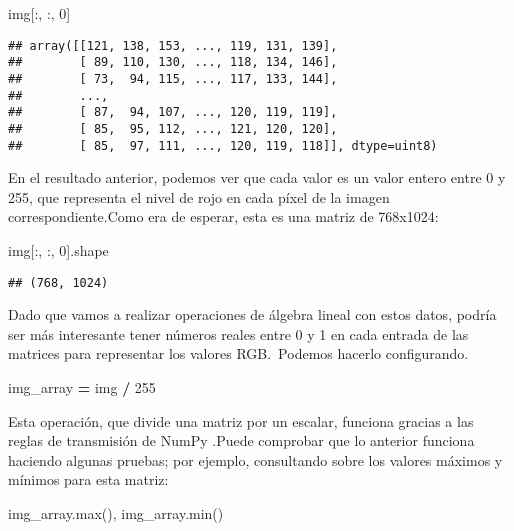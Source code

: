 \documentclass[
]{article}
\newenvironment{Shaded}{\begin{snugshade}}{\end{snugshade}}
\newcommand{\BuiltInTok}[1]{#1}
\newcommand{\DecValTok}[1]{\textcolor[rgb]{0.00,0.00,0.81}{#1}}
\newcommand{\NormalTok}[1]{#1}
\newcommand{\OperatorTok}[1]{\textcolor[rgb]{0.81,0.36,0.00}{\textbf{#1}}}
\begin{document}
\begin{Shaded}
\begin{Highlighting}[]
\NormalTok{img[:, :, }\DecValTok{0}\NormalTok{]}
\end{Highlighting}
\end{Shaded}

\begin{verbatim}
## array([[121, 138, 153, ..., 119, 131, 139],
##        [ 89, 110, 130, ..., 118, 134, 146],
##        [ 73,  94, 115, ..., 117, 133, 144],
##        ...,
##        [ 87,  94, 107, ..., 120, 119, 119],
##        [ 85,  95, 112, ..., 121, 120, 120],
##        [ 85,  97, 111, ..., 120, 119, 118]], dtype=uint8)
\end{verbatim}

En el resultado anterior, podemos ver que cada valor es un valor entero
entre 0 y 255, que representa el nivel de rojo en cada píxel de la
imagen correspondiente.Como era de esperar, esta es una matriz de
768x1024:

\begin{Shaded}
\begin{Highlighting}[]
\NormalTok{img[:, :, }\DecValTok{0}\NormalTok{].shape}
\end{Highlighting}
\end{Shaded}

\begin{verbatim}
## (768, 1024)
\end{verbatim}

Dado que vamos a realizar operaciones de álgebra lineal con estos datos,
podría ser más interesante tener números reales entre 0 y 1 en cada
entrada de las matrices para representar los valores RGB.~Podemos
hacerlo configurando.

\begin{Shaded}
\begin{Highlighting}[]
\NormalTok{img\_array }\OperatorTok{=}\NormalTok{ img }\OperatorTok{/} \DecValTok{255}
\end{Highlighting}
\end{Shaded}

Esta operación, que divide una matriz por un escalar, funciona gracias a
las reglas de transmisión de NumPy .Puede comprobar que lo anterior
funciona haciendo algunas pruebas; por ejemplo, consultando sobre los
valores máximos y mínimos para esta matriz:

\begin{Shaded}
\begin{Highlighting}[]
\NormalTok{img\_array.}\BuiltInTok{max}\NormalTok{(), img\_array.}\BuiltInTok{min}\NormalTok{()}
\end{Highlighting}
\end{Shaded}
\end{document}
